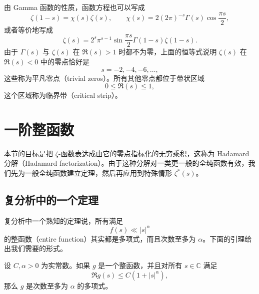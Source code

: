 \begin{remark}
	由 Gamma 函数的性质，函数方程也可以写成
	\[
		\zeta(1-s)=\chi(s)\zeta(s),
		\qquad
		\chi(s)=2(2\pi)^{-s}\Gamma(s)\cos\frac{\pi s}{2},
	\]
	或者等价地写成
	\[
		\zeta(s)
		=
		2^s\pi^{s-1}\sin\frac{\pi s}{2}\Gamma(1-s)\zeta(1-s).
	\]
	由于 $\Gamma(s)$ 与 $\zeta(s)$ 在 $\Re(s)>1$ 时都不为零，上面的恒等式说明 $\zeta(s)$ 在 $\Re(s)<0$ 中的零点恰好是
	\[
		s=-2,-4,-6,\ldots,
	\]
	这些称为平凡零点（trivial zeros）。所有其他零点都位于带状区域
	\[
		0\leq \Re(s)\leq 1,
	\]
	这个区域称为临界带（critical strip）。
\end{remark}

\section{一阶整函数}

本节的目标是把 $\zeta$-函数表达成由它的零点指标化的无穷乘积，这称为 Hadamard 分解（Hadamard factorization）。由于这种分解对一类更一般的全纯函数有效，我们先为一般全纯函数建立定理，然后再应用到特殊情形 $\zeta^*(s)$。

\subsection{复分析中的一个定理}

复分析中一个熟知的定理说，所有满足
\[
	f(s)\ll |s|^\alpha
\]
的整函数（entire function）其实都是多项式，而且次数至多为 $\alpha$。下面的引理给出我们需要的形式。

\begin{lemma}[原文 Lemma 9.1]
	设 $C,\alpha>0$ 为实常数。如果 $g$ 是一个整函数，并且对所有 $s\in\mathbb C$ 满足
	\begin{equation}
		\Re g(s)\leq C(1+|s|^\alpha),
		\tag{9.1}
	\end{equation}
	那么 $g$ 是次数至多为 $\alpha$ 的多项式。
\end{lemma}

